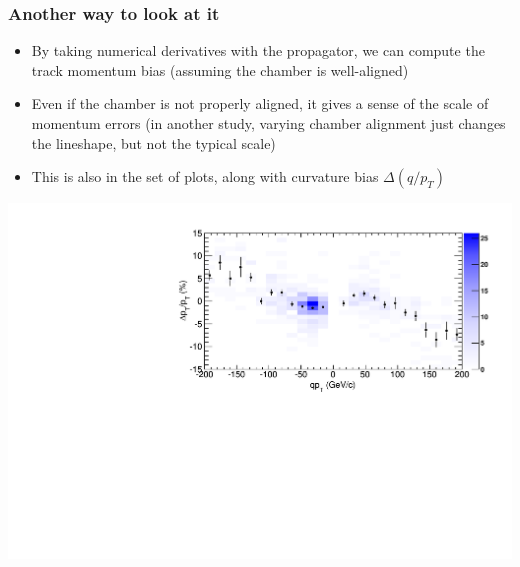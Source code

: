 \documentclass[compress]{beamer}
\begin{document}
\begin{frame}
\frametitle{Another way to look at it}

\begin{itemize}
\item By taking numerical derivatives with the propagator, we can
  compute the track momentum bias (assuming the chamber is well-aligned)
\item Even if the chamber is not properly aligned, it gives a sense of
  the scale of momentum errors (in another study, varying chamber
  alignment just changes the lineshape, but not the typical scale)
\item This is also in the set of plots, along with curvature bias $\Delta (q/p_T)$
\end{itemize}

\includegraphics[width=0.8\linewidth]{curvature_errors.pdf}
\end{frame}
\end{document}
